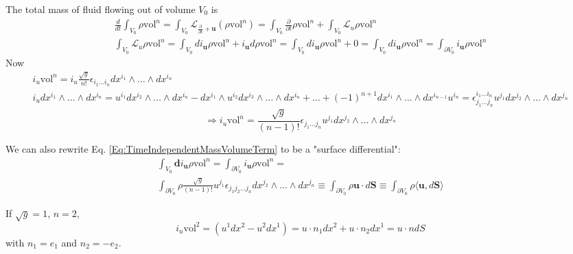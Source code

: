 \documentclass[10pt]{amsart}
\begin{document}
\begin{multicols*}{2}
The total mass of fluid flowing out of volume $V_0$ is 
\[
\begin{gathered}
\frac{d}{dt} \int_{V_0} \rho \text{vol}^n = \int_{V_0} \mathcal{L}_{\frac{\partial}{\partial t} + \textbf{u}} (\rho \text{vol}^n) = \int_{V_0} \frac{ \partial }{\partial t} \rho \text{vol}^n + \int_{V_0} \mathcal{L}_u \rho \text{vol}^n   \\
\int_{V_0} \mathcal{L}_u \rho \text{vol}^n = \int_{V_0} di_{\mathbf{u}} \rho \text{vol}^n  + i_{\mathbf{u}} d\rho \text{vol}^n = \int_{V_0} di_{\mathbf{u}} \rho \text{vol}^n + 0 = \int_{V_0} di_{\mathbf{u}} \rho \text{vol}^n = \int_{\partial V_0} i_{\mathbf{u}} \rho \text{vol}^n
\end{gathered}
\]  
Now
\[
\begin{gathered}
i_u \text{vol}^n = i_u\frac{\sqrt{g}}{n!} \epsilon_{i_1 \dots i_n} dx^{i_1} \wedge \dots \wedge dx^{i_n} \\ 
i_u dx^{i_1} \wedge \dots \wedge dx^{i_n} = u^{i_1} dx^{i_2} \wedge \dots \wedge dx^{i_n} - dx^{i_1} \wedge u^{i_2} dx^{i_3} \wedge \dots \wedge dx^{i_n} +  \dots + (-1)^{n+1} dx^{i_1} \wedge \dots \wedge dx^{i_{n-1}} u^{i_n} = \epsilon^{i_1 \dots i_n}_{j_1 \dots j_n } u^{j_1 } dx^{j_2} \wedge \dots \wedge dx^{j_n}  
\end{gathered} 
\]
\begin{equation}\label{Eq:TimeIndependentMassVolumeTerm}
\Longrightarrow i_u\text{vol}^n = \frac{ \sqrt{g}}{ (n-1)!} \epsilon_{j_1 \dots j_n} u^{j_1} dx^{j_2} \wedge \dots \wedge dx^{j_n}
\end{equation}

We can also rewrite Eq. \ref{Eq:TimeIndependentMassVolumeTerm} to be a "surface differential":
\begin{equation}
\begin{gathered}
\int_{V_0} \mathbf{d}i_{\mathbf{u}} \rho \text{vol}^n = \int_{\partial V_0} i_{\mathbf{u}} \rho \text{vol}^n = \\
\int_{\partial V_0} \rho \frac{ \sqrt{g}}{ (n-1)!} u^{j_1} \epsilon_{j_1 j_2 \dots j_n} dx^{j_2} \wedge \dots \wedge dx^{j_n} \equiv \int_{\partial V_0} \rho \mathbf{u} \cdot d\mathbf{S} \equiv \int_{\partial V_0} \rho \langle \mathbf{u}, d\mathbf{S} \rangle 
\end{gathered}
\end{equation}


If $\sqrt{g} = 1$, $n=2$, 
\[
i_u \text{vol}^2 = (u^1 dx^2 - u^2 dx^1) = u\cdot n_1 dx^2 + u\cdot n_2 dx^1 = u\cdot n dS
\]
with $n_1 =e_1$ and $n_2=-e_2$.  


\end{multicols*}
\end{document}
